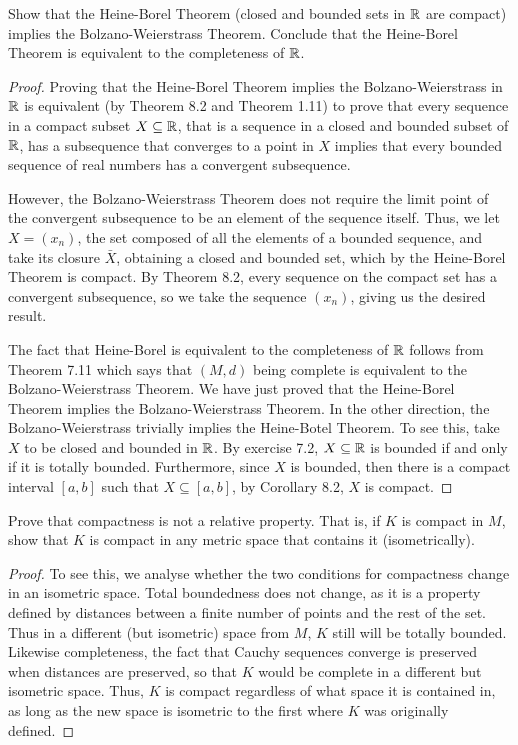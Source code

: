 \begin{exercise}{10}
Show that the Heine-Borel Theorem (closed and bounded sets in $\mathbb{R}$ are compact) implies the Bolzano-Weierstrass Theorem.
Conclude that the Heine-Borel Theorem is equivalent to the completeness of $\mathbb{R}$.
\end{exercise}
\begin{proof}
Proving that the Heine-Borel Theorem implies the Bolzano-Weierstrass in $\mathbb{R}$ is equivalent (by Theorem 8.2 and Theorem 1.11) to prove that every sequence in a compact subset $X\subseteq\mathbb{R}$, that is a sequence in a closed and bounded subset of $\mathbb{R}$, has a subsequence that converges to a point in $X$ implies that every bounded sequence of real numbers has a convergent subsequence.

However, the Bolzano-Weierstrass Theorem does not require the limit point of the convergent subsequence to be an element of the sequence itself. 
Thus, we let $X=(x_n)$, the set composed of all the elements of a bounded sequence, and take its closure $\bar{X}$, obtaining a closed and bounded set, which by the Heine-Borel Theorem is compact.
By Theorem 8.2, every sequence on the compact set has a convergent subsequence, so we take the sequence $(x_n)$, giving us the desired result.

The fact that Heine-Borel is equivalent to the completeness of $\mathbb{R}$ follows from Theorem 7.11 which says that $(M,d)$ being complete is equivalent to the Bolzano-Weierstrass Theorem.
We have just proved that the Heine-Borel Theorem implies the Bolzano-Weierstrass Theorem.
In the other direction, the Bolzano-Weierstrass trivially implies the Heine-Botel Theorem. 
To see this, take $X$ to be closed and bounded in $\mathbb{R}$.
By exercise 7.2, $X\subseteq\mathbb{R}$ is bounded if and only if it is totally bounded.
Furthermore, since $X$ is bounded, then there is a compact interval $[a,b]$ such that $X\subseteq [a,b]$, by Corollary 8.2, $X$ is compact.
\end{proof} 

\begin{exercise}{11}
Prove that compactness is not a relative property.
That is, if $K$ is compact in $M$, show that $K$ is compact in any metric space that contains it (isometrically).
\end{exercise}
\begin{proof}
To see this, we analyse whether the two conditions for compactness change in an isometric space.
Total boundedness does not change, as it is a property defined by distances between a finite number of points and the rest of the set.
Thus in a different (but isometric) space from $M$, $K$ still will be totally bounded.
Likewise completeness, the fact that Cauchy sequences converge is preserved when distances are preserved, so that $K$ would be complete in a different but isometric space.
Thus, $K$ is compact regardless of what space it is contained in, as long as the new space is isometric to the first where $K$ was originally defined.
\end{proof} 

